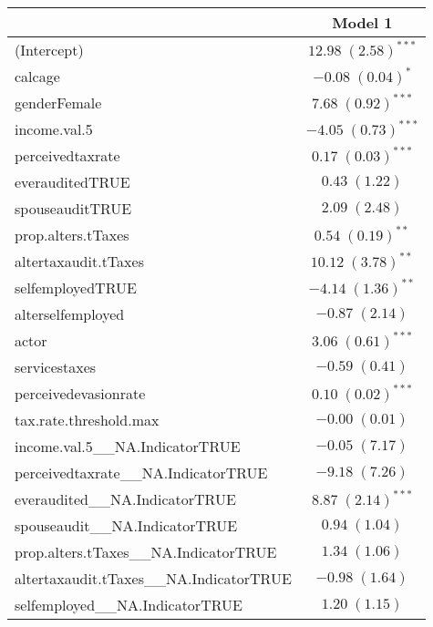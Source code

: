 
\begin{table}
\begin{tabular}{l c }
\hline
 & Model 1 \\
\hline
(Intercept)                                & $12.98 \; (2.58)^{***}$  \\
calcage                                    & $-0.08 \; (0.04)^{*}$    \\
genderFemale                               & $7.68 \; (0.92)^{***}$   \\
income.val.5                               & $-4.05 \; (0.73)^{***}$  \\
perceivedtaxrate                           & $0.17 \; (0.03)^{***}$   \\
everauditedTRUE                            & $0.43 \; (1.22)$         \\
spouseauditTRUE                            & $2.09 \; (2.48)$         \\
prop.alters.tTaxes                         & $0.54 \; (0.19)^{**}$    \\
altertaxaudit.tTaxes                       & $10.12 \; (3.78)^{**}$   \\
selfemployedTRUE                           & $-4.14 \; (1.36)^{**}$   \\
alterselfemployed                          & $-0.87 \; (2.14)$        \\
actor                                      & $3.06 \; (0.61)^{***}$   \\
servicestaxes                              & $-0.59 \; (0.41)$        \\
perceivedevasionrate                       & $0.10 \; (0.02)^{***}$   \\
tax.rate.threshold.max                     & $-0.00 \; (0.01)$        \\
income.val.5\_\_NA.IndicatorTRUE           & $-0.05 \; (7.17)$        \\
perceivedtaxrate\_\_NA.IndicatorTRUE       & $-9.18 \; (7.26)$        \\
everaudited\_\_NA.IndicatorTRUE            & $8.87 \; (2.14)^{***}$   \\
spouseaudit\_\_NA.IndicatorTRUE            & $0.94 \; (1.04)$         \\
prop.alters.tTaxes\_\_NA.IndicatorTRUE     & $1.34 \; (1.06)$         \\
altertaxaudit.tTaxes\_\_NA.IndicatorTRUE   & $-0.98 \; (1.64)$        \\
selfemployed\_\_NA.IndicatorTRUE           & $1.20 \; (1.15)$         \\

\end{tabular}
\end{table}
